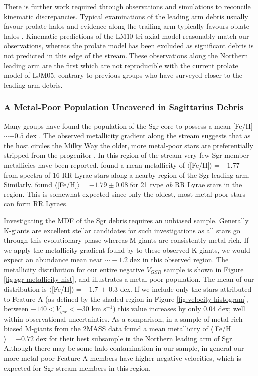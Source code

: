 \documentclass[preprint2]{aastex}
\begin{document}
	There is further work required through observations and simulations to reconcile kinematic discrepancies. Typical examinations of the leading arm debris usually favour prolate halos and evidence along the trailing arm typically favours oblate halos \citep{Helmi_2004, Martinez-Delgado;et-al_2004, Law;et-al_2005}. Kinematic predictions of the LM10 tri-axial model reasonably match our observations, whereas the prolate model has been excluded as significant debris is not predicted in this edge of the stream. These observations along the Northern leading arm are the first which are not reproducible with the current prolate model of LJM05, contrary to previous groups who have surveyed closer to the leading arm debris.

	\subsubsection{A Metal-Poor Population Uncovered in Sagittarius Debris}
	\label{sec:sgr-metal-poor}
		
	Many groups have found the population of the Sgr core to possess a mean [Fe/H] $\sim -0.5$ dex \citep{Cacciari;et-al_2002, Bonifacio;et-al_2004, Monaco;et-al_2005}. The observed metallicity gradient along the stream suggests that as the host circles the Milky Way the older, more metal-poor stars are preferentially stripped from the progenitor \citep{Chou;et-al_2007, Keller;Yong;Da_Costa_2010}. In this region of the stream very few Sgr member metallicies have been reported. \citet{Vivas;et-al_2005} found a mean metallicity of $\langle$[Fe/H]$\rangle = -1.77$ from spectra of 16 RR Lyrae stars along a nearby region of the Sgr leading arm. Similarly, \citet{Prior;et-al_2009b} found $\langle$[Fe/H]$\rangle = -1.79 \pm 0.08$ for 21 type \textit{ab} RR Lyrae stars in the region. This is somewhat expected since only the oldest, most metal-poor stars can form RR Lyraes. 
	
	Investigating the MDF of the Sgr debris requires an unbiased sample. Generally K-giants are excellent stellar candidates for such investigations as all stars go through this evolutionary phase whereas M-giants are consistently metal-rich. If we apply the metallicity gradient found by \citet[][from M-giants]{Keller;Yong;Da_Costa_2010} to these observed K-giants, we would expect an abundance mean near $\sim{}-1.2$ dex in this observed region. The metallicity distribution for our entire negative $V_{GSR}$ sample is shown in Figure \ref{fig:sgr-metallicity-hist}, and illustrates a metal-poor population. The mean of our distribution is $\langle$[Fe/H]$\rangle = -1.7\,\pm\,0.3$ dex. If we include only the stars attributed to Feature A (as defined by the shaded region in Figure \ref{fig:velocity-histogram}, between $-140 < V_{gsr} < -30$ km s$^{-1}$) this value increases by only 0.04 dex; well within observational uncertainties. As a comparison, in a sample of metal-rich biased M-giants from the 2MASS data \citet{Chou;et-al_2007} found a mean metallicity of $\langle$[Fe/H]$\rangle = -0.72$ dex for their best subsample in the Northern leading arm of Sgr. Although there may be some halo contamination in our sample, in general our more metal-poor Feature A members have higher negative velocities, which is expected for Sgr stream members in this region.
		
\end{document}
